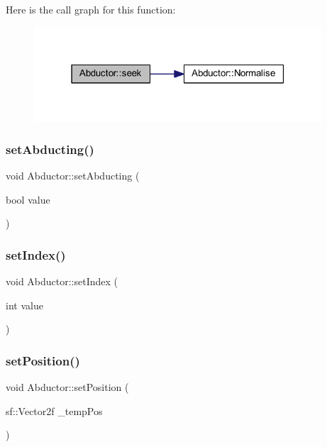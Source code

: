 Here is the call graph for this function\+:
\nopagebreak
\begin{figure}[H]
\begin{center}
\leavevmode
\includegraphics[width=304pt]{class_abductor_a6562333549ea4d8ef5d389e0594de7c1_cgraph}
\end{center}
\end{figure}
\mbox{\label{class_abductor_a1069f5de8e0696be938a741f4b931855}} 
\subsubsection{\texorpdfstring{set\+Abducting()}{setAbducting()}}
{\footnotesize\ttfamily void Abductor\+::set\+Abducting (\begin{DoxyParamCaption}\item[{bool}]{value }\end{DoxyParamCaption})}

\mbox{\label{class_abductor_a4eab3b0823078780f2129873bcd181ae}} 
\subsubsection{\texorpdfstring{set\+Index()}{setIndex()}}
{\footnotesize\ttfamily void Abductor\+::set\+Index (\begin{DoxyParamCaption}\item[{int}]{value }\end{DoxyParamCaption})}

\mbox{\label{class_abductor_a8120f5a1284a3269345b213dc1074d17}} 
\subsubsection{\texorpdfstring{set\+Position()}{setPosition()}}
{\footnotesize\ttfamily void Abductor\+::set\+Position (\begin{DoxyParamCaption}\item[{sf\+::\+Vector2f}]{\+\_\+temp\+Pos }\end{DoxyParamCaption})}

